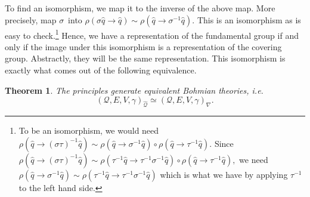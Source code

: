 \documentclass[11pt]{article}
\newtheorem{theorem}{Theorem}
\theoremstyle{remark}
\begin{document}
To find an isomorphism, we map it to the
inverse of the above map. More precisely, map \ensuremath{\sigma}\ into
$\ensuremath{\ensuremath{\rho}}(\ensuremath{\sigma} \ensuremath{\hat{q}} \to \ensuremath{\hat{q}}) \ensuremath{\sim} \ensuremath{\ensuremath{\rho}}(\ensuremath{\hat{q}} \to \ensuremath{\sigma}^{-1}
\ensuremath{\hat{q}})$. This is an isomorphism as is easy to check.\footnote{To be an
  isomorphism, we would need $\ensuremath{\ensuremath{\rho}}(\ensuremath{\hat{q}} \to (\ensuremath{\sigma} \tau)^{-1} \ensuremath{\hat{q}}) \ensuremath{\sim}
  \ensuremath{\ensuremath{\rho}}(\ensuremath{\hat{q}} \to \ensuremath{\sigma}^{-1} \ensuremath{\hat{q}}) \circ \ensuremath{\ensuremath{\rho}}(\ensuremath{\hat{q}} \to \tau^{-1}
  \ensuremath{\hat{q}})$. Since $\ensuremath{\ensuremath{\rho}}(\ensuremath{\hat{q}} \to (\ensuremath{\sigma} \tau)^{-1} \ensuremath{\hat{q}}) \ensuremath{\sim}
  \ensuremath{\ensuremath{\rho}}(\tau^{-1} \ensuremath{\hat{q}} \to \tau^{-1} \ensuremath{\sigma}^{-1} \ensuremath{\hat{q}}) \circ
\ensuremath{\ensuremath{\rho}}(\ensuremath{\hat{q}} \to \tau^{-1}
  \ensuremath{\hat{q}}),$
 we need 
$\ensuremath{\ensuremath{\rho}}(\ensuremath{\hat{q}} \to \ensuremath{\sigma}^{-1} \ensuremath{\hat{q}})
  \ensuremath{\sim} \ensuremath{\ensuremath{\rho}}(\tau^{-1} \ensuremath{\hat{q}} \to \tau^{-1} \ensuremath{\sigma}^{-1} \ensuremath{\hat{q}})$ which
  is what we have 
   by applying $\tau^{-1}$ to
  the left hand side.} Hence, we have a representation of the
fundamental group if and only if the image under this isomorphism is a
representation of the covering group. Abstractly, they will be the
same representation.  This isomorphism is exactly what comes out of
the following equivalence. 


\begin{theorem} 
The principles generate equivalent Bohmian theories, i.e.\ 
\[(\ensuremath{\mathcal{Q}}, E, V, \ensuremath{\gamma})_{\ensuremath{\widehat{\ensuremath{\mathcal{Q}}}}} \ensuremath{\simeq} (\ensuremath{\mathcal{Q}}, E, V,
\ensuremath{\gamma})_{\nabla}.\] 
\end{theorem}
\end{document}
